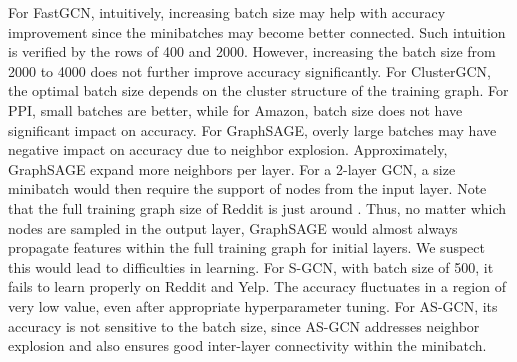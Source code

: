 \documentclass{article} \usepackage{iclr2020_conference,times}
\begin{document}
For FastGCN, intuitively, increasing batch size may help with accuracy improvement since the minibatches may become better connected. 
Such intuition is verified by the rows of 400 and 2000. However, increasing the batch size from 2000 to 4000 does not further improve accuracy significantly. 
For ClusterGCN, the optimal batch size depends on the cluster structure of the training graph. For PPI, small batches are better, while for Amazon, batch size does not have significant impact on accuracy. 
For GraphSAGE, overly large batches may have negative impact on accuracy due to neighbor explosion. Approximately, GraphSAGE expand  more neighbors per layer. For a 2-layer GCN, a size  minibatch would then require the support of  nodes from the input layer. Note that the full training graph size of Reddit is just around . Thus, no matter which nodes are sampled in the output layer, GraphSAGE would almost always propagate features within the full training graph for initial layers. We suspect this would lead to difficulties in learning.
For S-GCN, with batch size of 500, it fails to learn properly on Reddit and Yelp. The accuracy fluctuates in a region of very low value, even after appropriate hyperparameter tuning. 
For AS-GCN, its accuracy is not sensitive to the batch size, since AS-GCN addresses neighbor explosion and also ensures good inter-layer connectivity within the minibatch. 






 
\end{document}
